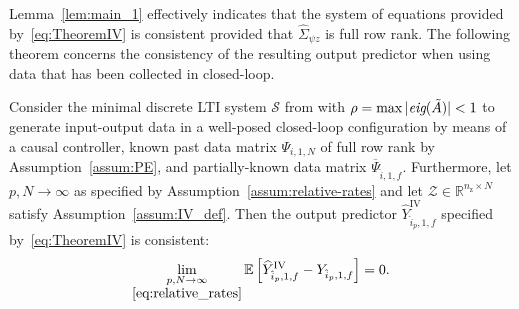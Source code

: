 Lemma~\ref{lem:main_1} effectively indicates that the system of equations provided by~\eqref{eq:TheoremIV} is consistent provided that $\hat{\Sigma}_{\psi z}$ is full row rank. The following theorem concerns the consistency of the resulting output predictor when using data that has been collected in closed-loop.
\setcounter{thm}{0}
\begin{thm}\label{theorem:main_result_IVs}
    Consider the minimal discrete \ac{LTI} system $\mathcal{S}$ from  with $\rho=\max|\emph{eig}(\tilde{A})|<1$ to generate input-output data in a well-posed closed-loop configuration by means of a causal controller, known past data matrix $\Psi_{i,1,N}$ of full row rank by Assumption~\ref{assum:PE}, and partially-known data matrix $\overline{\Psi}_{\hat{i},1,f}$. Furthermore, let $p,N\rightarrow\infty$ as specified by Assumption~\ref{assum:relative-rates} and let ${\mathcal{Z}\in\mathbb{R}^{n_\mathrm{z}\times N}}$ satisfy Assumption~\ref{assum:IV_def}. Then the output predictor $\widehat{Y}_{\hat{i}_p,1,f}^\mathrm{IV}$ specified by~\eqref{eq:TheoremIV} is consistent:
    \begin{align}\label{eq:consistent}
    \lim_{\underset{\eqref{eq:relative_rates}}{p,N\rightarrow\infty}}\mathbb{E}\left[\widehat{Y}_{\hat{i}_p,1,f}^\mathrm{IV}-Y_{\hat{i}_p,1,f}\right]=0.
    \end{align}
\end{thm}
%
